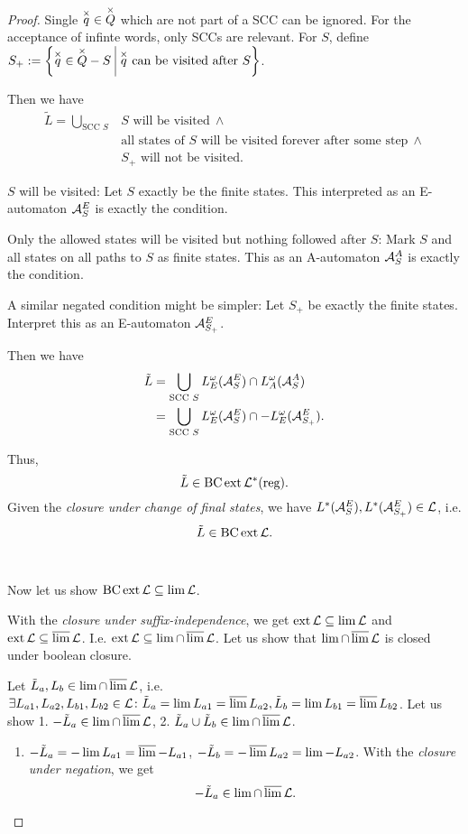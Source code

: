 \begin{lemma}
\begin{proof}
Single $\overset{\times}{q} \in \overset{\times}{Q}$ which are not part of a SCC can be ignored. For the acceptance of infinte words, only SCCs are relevant. For $S$, define $S_+ := \Set{\overx{q} \in \overx{Q}-S}{\overx{q} \text{ can be visited after } S}$.

Then we have
\begin{align*}
\tilde L = \bigcup_{\text{SCC } S} & S \text{ will be visited} \ \wedge \\
& \text{all states of } S \text{ will be visited forever after some step} \ \wedge \\
& S_+ \text{ will not be visited} .
\end{align*}

$S$ will be visited: Let $S$ exactly be the finite states. This interpreted as an E-automaton $\mathcal{A}^E_S$ is exactly the condition.

Only the allowed states will be visited but nothing followed after $S$: Mark $S$ and all states on all paths to $S$ as finite states. This as an A-automaton $\mathcal{A}^A_S$ is exactly the condition.

A similar negated condition might be simpler: Let $S_+$ be exactly the finite states. Interpret this as an E-automaton $\mathcal{A}^E_{S_+}$.

Then we have
\begin{align*}
\tilde L & = \bigcup_{\text{SCC } S} L^\omega_E (\mathcal{A}^E_S) \cap L^\omega_A (\mathcal{A}^A_S) \\
& = \bigcup_{\text{SCC } S} L^\omega_E (\mathcal{A}^E_S) \cap -L^\omega_E (\mathcal{A}^E_{S_+}) .
\end{align*}

Thus,
\[ \tilde L \in \operatorname{BC} \operatorname{ext} \mathcal{L}^*(\text{reg}) . \]
Given the \emph{closure under change of final states}, we have $L^*(\mathcal{A}^E_S), L^*(\mathcal{A}^E_{S_+}) \in \mathcal{L}$, i.e.
\[ \tilde L \in \operatorname{BC} \operatorname{ext} \mathcal{L} . \]

\

Now let us show $\operatorname{BC} \operatorname{ext} \mathcal{L} \subseteq \lim \mathcal{L}$.

With the \emph{closure under suffix-independence}, we get $\operatorname{ext} \mathcal{L} \subseteq \lim \mathcal{L}$ and $\operatorname{ext} \mathcal{L} \subseteq \operatorname{\overline{lim}} \mathcal{L}$. I.e. $\operatorname{ext} \mathcal{L} \subseteq \lim \cap \operatorname{\overline{lim}} \mathcal{L}$. Let us show that $\lim \cap \operatorname{\overline{lim}} \mathcal{L}$ is closed under boolean closure.

Let $\tilde L_a,L_b \in \lim \cap \operatorname{\overline{lim}} \mathcal{L}$, i.e. $\exists L_{a1}, L_{a2}, L_{b1}, L_{b2} \in \mathcal{L} \colon \tilde L_a = \lim L_{a1} = \operatorname{\overline{lim}} L_{a2}, \tilde L_b = \lim L_{b1} = \operatorname{\overline{lim}} L_{b2}$. Let us show 1. $-\tilde L_a \in \lim \cap \operatorname{\overline{lim}} \mathcal{L}$, 2. $\tilde L_a \cup \tilde L_b \in \lim \cap \operatorname{\overline{lim}} \mathcal{L}$.
\begin{enumerate}
\item $-\tilde L_a = -\lim L_{a1} = \operatorname{\overline{lim}} -L_{a1}$, $-\tilde L_b = -\operatorname{\overline{lim}} L_{a2} = \lim -L_{a2}$. With the \emph{closure under negation}, we get
\[ -\tilde L_a \in \lim \cap \operatorname{\overline{lim}} \mathcal{L} . \]


\end{enumerate}
\end{proof}
\end{lemma}
